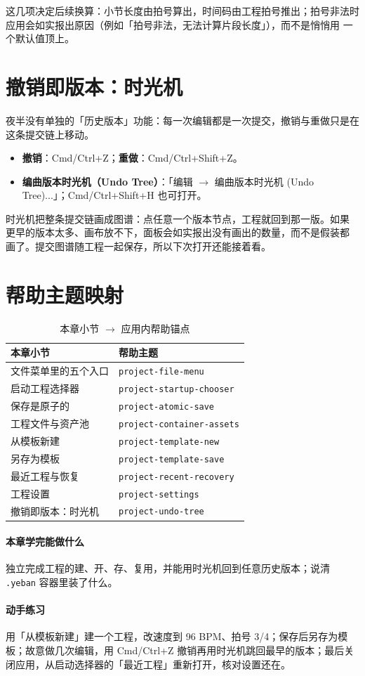 这几项决定后续换算：小节长度由拍号算出，时间码由工程拍号推出；拍号非法时
应用会如实报出原因（例如「拍号非法，无法计算片段长度」），而不是悄悄用
一个默认值顶上。


\section{撤销即版本：时光机}

夜半没有单独的「历史版本」功能：每一次编辑都是一次提交，撤销与重做只是在
这条提交链上移动。

\begin{itemize}
  \item \textbf{撤销}：Cmd/Ctrl+Z；\textbf{重做}：Cmd/Ctrl+Shift+Z。
  \item \textbf{编曲版本时光机（Undo Tree）}：「编辑 $\to$ 编曲版本时光机 (Undo Tree)...」；Cmd/Ctrl+Shift+H 也可打开。
\end{itemize}

时光机把整条提交链画成图谱：点任意一个版本节点，工程就回到那一版。如果
更早的版本太多、画布放不下，面板会如实报出没有画出的数量，而不是假装都
画了。提交图谱随工程一起保存，所以下次打开还能接着看。


\section{帮助主题映射}

\begin{table}[htbp]
\centering
\caption{本章小节 $\to$ 应用内帮助锚点}
\label{tab:ch02-help}
\begin{tabular}{ll}
\hline
本章小节 & 帮助主题 \\
\hline
文件菜单里的五个入口 & \texttt{project-file-menu} \\
启动工程选择器 & \texttt{project-startup-chooser} \\
保存是原子的 & \texttt{project-atomic-save} \\
工程文件与资产池 & \texttt{project-container-assets} \\
从模板新建 & \texttt{project-template-new} \\
另存为模板 & \texttt{project-template-save} \\
最近工程与恢复 & \texttt{project-recent-recovery} \\
工程设置 & \texttt{project-settings} \\
撤销即版本：时光机 & \texttt{project-undo-tree} \\
\hline
\end{tabular}
\end{table}

\paragraph{本章学完能做什么} 独立完成工程的建、开、存、复用，并能用时光机回到任意历史版本；说清 \texttt{.yeban} 容器里装了什么。

\paragraph{动手练习} 用「从模板新建」建一个工程，改速度到 96 BPM、拍号 3/4；保存后另存为模板；故意做几次编辑，用 Cmd/Ctrl+Z 撤销再用时光机跳回最早的版本；最后关闭应用，从启动选择器的「最近工程」重新打开，核对设置还在。

